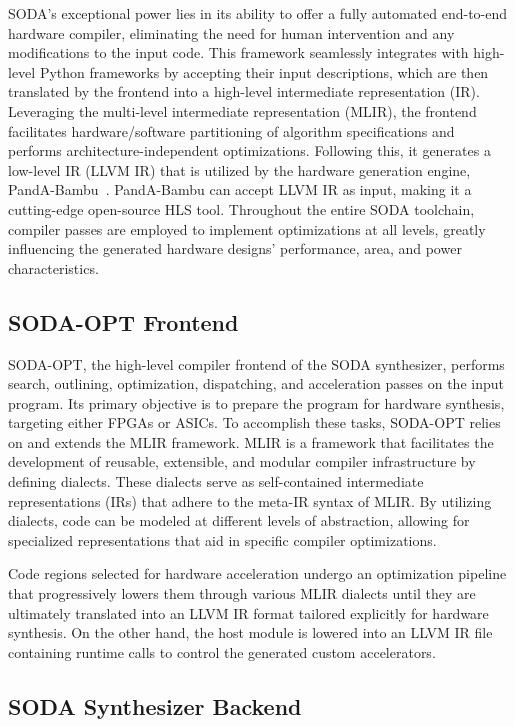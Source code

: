 SODA's exceptional power lies in its ability to offer a fully automated end-to-end hardware compiler, eliminating the need for human intervention and any modifications to the input code.
This framework seamlessly integrates with high-level Python frameworks by accepting their input descriptions, which are then translated by the frontend into a high-level intermediate representation (IR).
Leveraging the multi-level intermediate representation (MLIR), the frontend facilitates hardware/software partitioning of algorithm specifications and performs architecture-independent optimizations.
Following this, it generates a low-level IR (LLVM IR) that is utilized by the hardware generation engine, PandA-Bambu~\cite{9586110}.
PandA-Bambu can accept LLVM IR as input, making it a cutting-edge open-source HLS tool.
Throughout the entire SODA toolchain, compiler passes are employed to implement optimizations at all levels, greatly influencing the generated hardware designs' performance, area, and power characteristics.

\subsection{SODA-OPT Frontend}
\label{subsec:soda_frontend}%

SODA-OPT, the high-level compiler frontend of the SODA synthesizer, performs search, outlining, optimization, dispatching, and acceleration passes on the input program.
Its primary objective is to prepare the program for hardware synthesis, targeting either FPGAs or ASICs.
To accomplish these tasks, SODA-OPT relies on and extends the MLIR framework.
MLIR is a framework that facilitates the development of reusable, extensible, and modular compiler infrastructure by defining dialects.
These dialects serve as self-contained intermediate representations (IRs) that adhere to the meta-IR syntax of MLIR.
By utilizing dialects, code can be modeled at different levels of abstraction, allowing for specialized representations that aid in specific compiler optimizations.

 Code regions selected for hardware acceleration undergo an optimization pipeline that progressively lowers them through various MLIR dialects until they are ultimately translated into an LLVM IR format tailored explicitly for hardware synthesis.
On the other hand, the host module is lowered into an LLVM IR file containing runtime calls to control the generated custom accelerators.

\subsection{SODA Synthesizer Backend}
\label{subsec:soda_backend}%

